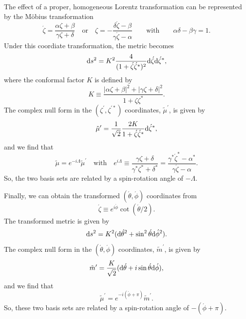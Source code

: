 \documentclass[11pt]{article}
\begin{document}
The effect of a proper, homogeneous Lorentz transformation can be
represented by the M\"{o}bius transformation
\begin{equation}\label{eq:Mobius-def}
  \acute\zeta = \frac{\alpha\zeta+\beta}{\gamma\zeta+\delta}
\quad\mbox{or}\quad
  \zeta = -\frac{\delta\acute\zeta-\beta}{\gamma\acute\zeta-\alpha}
\qquad\mbox{with}\qquad
\alpha\delta-\beta\gamma=1.
\end{equation}
Under this coordiate transformation, the metric becomes
\begin{equation}
  {\rm d}s^2 = K^2\frac4{(1+\acute\zeta\acute\zeta^*)^2}
              {\rm d}\acute\zeta{\rm d}\acute\zeta^*,
\end{equation}
where the conformal factor $K$ is defined by
\begin{equation}
  K\equiv \frac{|\alpha\zeta+\beta|^2+|\gamma\zeta+\delta|^2}{1+\zeta\zeta^*}.
\end{equation}
The complex null form in the $(\zeta^\prime,\zeta^{\prime*})$ coordinates,
$\tilde\mu^\prime$, is given by
\begin{equation}
  \tilde\mu^\prime = \frac1{\sqrt2}\frac{2K}{1+\acute\zeta\acute\zeta^*}
           {\rm d}\acute\zeta^*,
\end{equation}
and we find that
\begin{equation}
  \tilde\mu = e^{-i\Lambda}\tilde\mu^\prime
\quad\mbox{with}\quad e^{i\Lambda}\equiv 
   \frac{\gamma\zeta+\delta}{\gamma^*\zeta^*+\delta^*} =
   \frac{\gamma^*\acute\zeta^*-\alpha^*}{\gamma\acute\zeta-\alpha}.
\end{equation}
So, the two basis sets are related by a spin-rotation angle of $-\Lambda$.

Finally, we can obtain the transformed $(\acute\theta,\acute\phi)$
coordinates from
\begin{equation}
  \acute\zeta\equiv e^{i\acute\phi}\cot(\acute\theta/2).
\end{equation}
The transformed metric is given by
\begin{equation}
{\rm d}s^2 = K^2({\rm d}\acute\theta^2+\sin^2\acute\theta{\rm d}\acute\phi^2).
\end{equation}
The complex null form in the $(\acute\theta,\acute\phi)$ coordinates,
$\tilde{m}^\prime$, is given by
\begin{equation}
\tilde{m}^\prime = \frac{K}{\sqrt2}
      ({\rm d}\acute\theta+i\sin\acute\theta{\rm d}\acute\phi),
\end{equation}
and we find that
\begin{equation}
\tilde\mu^\prime = e^{-i(\acute\phi+\pi)}\tilde{m}^\prime.
\end{equation}
So, these two basis sets are related by a spin-rotation angle of
$-(\acute\phi+\pi)$.
\end{document}
